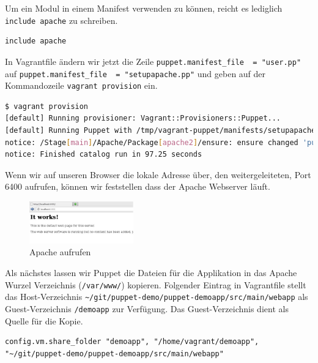 \documentclass[12pt,a4paper,ngerman]{article}
\begin{document}
Um ein Modul in einem Manifest verwenden zu können, reicht es lediglich \lstinline$include apache$ zu schreiben.
\begin{lstlisting}[language=puppet,caption=Inhalt von manifests/setupapache.pp, label=setupapache.pp]
include apache
\end{lstlisting}

In Vagrantfile ändern wir jetzt die Zeile \lstinline$puppet.manifest_file  = "user.pp"$ auf \lstinline$puppet.manifest_file  = "setupapache.pp"$ und geben auf der Kommandozeile \lstinline$vagrant provision$ ein.

\begin{lstlisting}[language=sh,caption=vagrant provisioning für Apache, label=provisioning_apache]
$ vagrant provision
[default] Running provisioner: Vagrant::Provisioners::Puppet...
[default] Running Puppet with /tmp/vagrant-puppet/manifests/setupapache.pp...
notice: /Stage[main]/Apache/Package[apache2]/ensure: ensure changed 'purged' to 'present'
notice: Finished catalog run in 97.25 seconds
\end{lstlisting}

Wenn wir auf unseren Browser die lokale Adresse über, den weitergeleiteten, Port 6400 aufrufen, können wir feststellen dass der Apache Webserver läuft.
\begin{figure}
  \begin{center}
    \includegraphics[width=0.4\textwidth]{images/apache.pdf}
  \end{center}
  \caption{Apache aufrufen}
  \label{apache}
\end{figure}

Als nächstes lassen wir Puppet die Dateien für die Applikation in das Apache Wurzel Verzeichnis (\lstinline$/var/www/$) kopieren. Folgender Eintrag in Vagrantfile stellt das Host-Verzeichnis \lstinline$~/git/puppet-demo/puppet-demoapp/src/main/webapp$ als Guest-Verzeichnis \lstinline$/demoapp$ zur Verfügung. Das Guest-Verzeichnis dient als Quelle für die Kopie.
\begin{lstlisting}[language=vagrant,caption=Shared folders in Vagrantfile konfigurieren, label=vagrantsharedfolder]
config.vm.share_folder "demoapp", "/home/vagrant/demoapp", "~/git/puppet-demo/puppet-demoapp/src/main/webapp"
\end{lstlisting}
\end{document}
